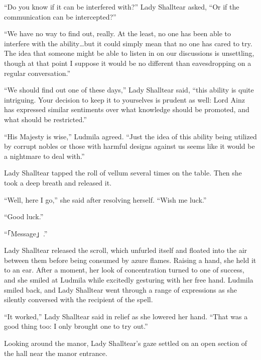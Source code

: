  

“Do you know if it can be interfered with?” Lady Shalltear asked, “Or if the communication can be intercepted?”

 

“We have no way to find out, really. At the least, no one has been able to interfere with the ability…but it could simply mean that no one has cared to try. The idea that someone might be able to listen in on our discussions is unsettling, though at that point I suppose it would be no different than eavesdropping on a regular conversation.”

 

“We should find out one of these days,” Lady Shalltear said, “this ability is quite intriguing. Your decision to keep it to yourselves is prudent as well: Lord Ainz has expressed similar sentiments over what knowledge should be promoted, and what should be restricted.”

 

“His Majesty is wise,” Ludmila agreed. “Just the idea of this ability being utilized by corrupt nobles or those with harmful designs against us seems like it would be a nightmare to deal with.”

 

Lady Shalltear tapped the roll of vellum several times on the table. Then she took a deep breath and released it.

 

“Well, here I go,” she said after resolving herself. “Wish me luck.”

 

“Good luck.”

 

“「Message」.”

 

Lady Shalltear released the scroll, which unfurled itself and floated into the air between them before being consumed by azure flames. Raising a hand, she held it to an ear. After a moment, her look of concentration turned to one of success, and she smiled at Ludmila while excitedly gesturing with her free hand. Ludmila smiled back, and Lady Shalltear went through a range of expressions as she silently conversed with the recipient of the spell.

 

“It worked,” Lady Shalltear said in relief as she lowered her hand. “That was a good thing too: I only brought one to try out.”

 

Looking around the manor, Lady Shalltear’s gaze settled on an open section of the hall near the manor entrance.

